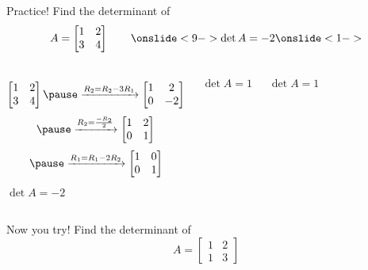\documentclass[xcoler=dvipsnames, aspectratio=169]{beamer}
\begin{document}
    \begin{frame}{Practice!}
        Find the determinant of
        \[
            A = \begin{bmatrix}
                1 & 2\\
                3 & 4
            \end{bmatrix}\qquad\onslide<9->\det{A} = -2\onslide<1->
        \]\pause
        \begin{columns}
            \[
                \begin{bmatrix}
                    1 & 2\\
                    3 & 4
                \end{bmatrix}\pause\xrightarrow{R_2=R_2-3R_1}\begin{bmatrix}
                    1 & 2\\
                    0 & -2
                \end{bmatrix}
            \]
            \[
                \pause\xrightarrow{R_2=\frac{-R_2}{2}}\begin{bmatrix}
                    1 & 2\\
                    0 & 1
                \end{bmatrix}
            \]
            \[
                \pause\xrightarrow{R_1=R_1-2R_2}\begin{bmatrix}
                    1 & 0\\
                    0 & 1
                \end{bmatrix}
            \]
            $\det{A} = -2$
            \vspace{20pt}

            $\det{A} = 1$
            \vspace{20pt}

            $\det{A} = 1$

        \end{columns}
    \end{frame}
    \begin{frame}{Now you try!}
        Find the determinant of
        \[
            A = \begin{bmatrix}
                1 & 2\\
                1 & 3
            \end{bmatrix}
        \]
        \vspace{130pt}
    \end{frame}
\end{document}
